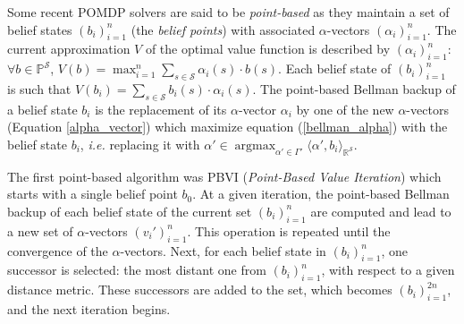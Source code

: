 Some recent POMDP solvers are said to be \textit{point-based} as they maintain
a set of belief states $(b_i)_{i=1}^n$ (the \textit{belief points}) 
with associated $\alpha$-vectors $(\alpha_i)_{i=1}^n$.
The current approximation $V$ of the optimal value function is described 
by $(\alpha_i)_{i=1}^n$: $\forall b \in \mathbb{P}^{\mathcal{S}}$,
$V(b) = \max_{i=1}^n \sum_{s \in \mathcal{S}} \alpha_i(s) \cdot b(s)$. 
Each belief state of $(b_i)_{i=1}^n$ is such that
$V(b_i) = \sum_{s \in \mathcal{S}} b_i(s) \cdot \alpha_i(s)$.
The point-based Bellman backup of a belief state $b_i$ is the replacement of its $\alpha$-vector 
$\alpha_i$ by one of the new $\alpha$-vectors (Equation \ref{alpha_vector}) 
which maximize equation (\ref{bellman_alpha}) 
with the belief state $b_i$, \textit{i.e.} replacing it with 
$\alpha' \in \operatorname*{argmax}_{\alpha' \in \Gamma'} \langle \alpha', b_i \rangle_{\mathbb{R}^{\mathcal{S}}}$.

The first point-based algorithm was PBVI (\textit{Point-Based Value Iteration})
\cite{Pineau_2003_4826} which starts with a single belief point $b_0$.
At a given iteration, the point-based Bellman backup of each belief state
of the current set $(b_i)_{i=1}^n$ are computed and lead to a new set of 
$\alpha$-vectors $(v_i')_{i=1}^n$. This operation is repeated until
the convergence of the $\alpha$-vectors. Next, for each belief state in $(b_i)_{i=1}^n$,
one successor is selected: the most distant one from $(b_i)_{i=1}^n$, 
with respect to a given distance metric.
These successors are added to the set, which becomes $(b_i)_{i=1}^{2n}$,
and the next iteration begins.

